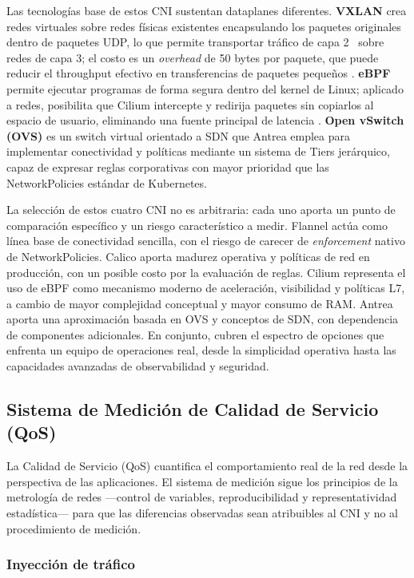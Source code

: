 Las tecnologías base de estos CNI sustentan dataplanes diferentes. \textbf{VXLAN} crea redes virtuales sobre redes físicas existentes encapsulando los paquetes originales dentro de paquetes UDP, lo que permite transportar tráfico de capa 2~\cite{ref19} sobre redes de capa 3; el costo es un \emph{overhead} de 50 bytes por paquete, que puede reducir el throughput efectivo en transferencias de paquetes pequeños \cite{ref12}. \textbf{eBPF} permite ejecutar programas de forma segura dentro del kernel de Linux; aplicado a redes, posibilita que Cilium intercepte y redirija paquetes sin copiarlos al espacio de usuario, eliminando una fuente principal de latencia \cite{ref27}. \textbf{Open vSwitch (OVS)} es un switch virtual orientado a SDN \cite{ref22} que Antrea emplea para implementar conectividad y políticas mediante un sistema de Tiers jerárquico, capaz de expresar reglas corporativas con mayor prioridad que las NetworkPolicies estándar de Kubernetes.

La selección de estos cuatro CNI no es arbitraria: cada uno aporta un punto de comparación específico y un riesgo característico a medir. Flannel actúa como línea base de conectividad sencilla, con el riesgo de carecer de \emph{enforcement} nativo de NetworkPolicies. Calico aporta madurez operativa y políticas de red en producción, con un posible costo por la evaluación de reglas. Cilium representa el uso de eBPF como mecanismo moderno de aceleración, visibilidad y políticas L7, a cambio de mayor complejidad conceptual y mayor consumo de RAM. Antrea aporta una aproximación basada en OVS y conceptos de SDN, con dependencia de componentes adicionales. En conjunto, cubren el espectro de opciones que enfrenta un equipo de operaciones real, desde la simplicidad operativa hasta las capacidades avanzadas de observabilidad y seguridad.

\subsection{Sistema de Medición de Calidad de Servicio (QoS)}

La Calidad de Servicio (QoS) cuantifica el comportamiento real de la red desde la perspectiva de las aplicaciones. El sistema de medición sigue los principios de la metrología de redes ---control de variables, reproducibilidad y representatividad estadística--- para que las diferencias observadas sean atribuibles al CNI y no al procedimiento de medición.

\subsubsection{Inyección de tráfico}


